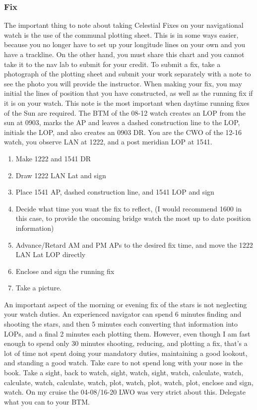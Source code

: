 \documentclass[letterpaper,12pt]{article}
\begin{document}
\subsubsection{Fix}
The important thing to note about taking Celestial Fixes on your navigational watch is the use of the communal plotting sheet.
This is in some ways easier, because you no longer have to set up your longitude lines on your own and you have a trackline.
On the other hand, you must share this chart and you cannot take it to the nav lab to submit for your credit.
To submit a fix, take a photograph of the plotting sheet and submit your work separately with a note to see the photo you will provide the instructor.
When making your fix, you may initial the lines of position that you have constructed, as well as the running fix if it is on your watch.
This note is the most important when daytime running fixes of the Sun are required.
The BTM of the 08-12 watch creates an LOP from the sun at 0903, marks the AP and leaves a dashed construction line to the LOP, initials the LOP, and also creates an 0903 DR.
You are the CWO of the 12-16 watch, you observe LAN at 1222, and a post meridian LOP \astrosun{} at 1541. 
\begin{enumerate}
	\item Make 1222 and 1541 DR
	\item Draw 1222 LAN Lat and sign
	\item Place 1541 AP, dashed construction line, and 1541 LOP and sign
	\item Decide what time you want the fix to reflect, (I would recommend 1600 in this case, to provide the oncoming bridge watch the most up to date position information)
	\item Advance/Retard AM and PM APs to the desired fix time, and move the 1222 LAN Lat LOP directly
	\item Enclose and sign the running fix
	\item Take a picture.
\end{enumerate}

An important aspect of the morning or evening fix of the stars is not neglecting your watch duties.
An experienced navigator can spend 6 minutes finding and shooting the stars, and then 5 minutes each converting that information into LOPs, and a final 2 minutes each plotting them. 
However, even though I am fast enough to spend only 30 minutes shooting, reducing, and plotting a fix, that's a lot of time not spent doing your mandatory duties, maintaining a good lookout, and standing a good watch.
Take care to not spend long with your nose in the book.
Take a sight, back to watch, sight, watch, sight, watch, calculate, watch, calculate, watch, calculate, watch, plot, watch, plot, watch, plot, enclose and sign, watch.
On my cruise the 04-08/16-20 LWO was very strict about this.
Delegate what you can to your BTM.
\clearpage
\printbibliography
\end{document}
